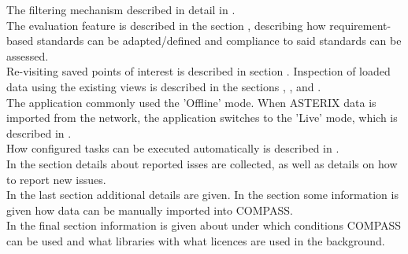 The filtering mechanism described in detail in . \\

The evaluation feature is described in the section , describing how requirement-based standards can be adapted/defined and compliance to said standards can be assessed. \\

Re-visiting saved points of interest is described in section . Inspection of loaded data using the existing views is described in the sections , ,  and . \\

The application commonly used the 'Offline' mode. When ASTERIX data is imported from the network, the application switches to the 'Live' mode, which is described in . \\

How configured tasks can be executed automatically is described in . \\

In the section  details about reported isses are collected, as well as details on how to report new issues. \\

In the last section  additional details are given. In the section  some information is given how data can be manually imported into COMPASS. \\ 

In the final section  information is given about under which conditions COMPASS can be used and what libraries with what licences are used in the background.

\pagebreak



%








